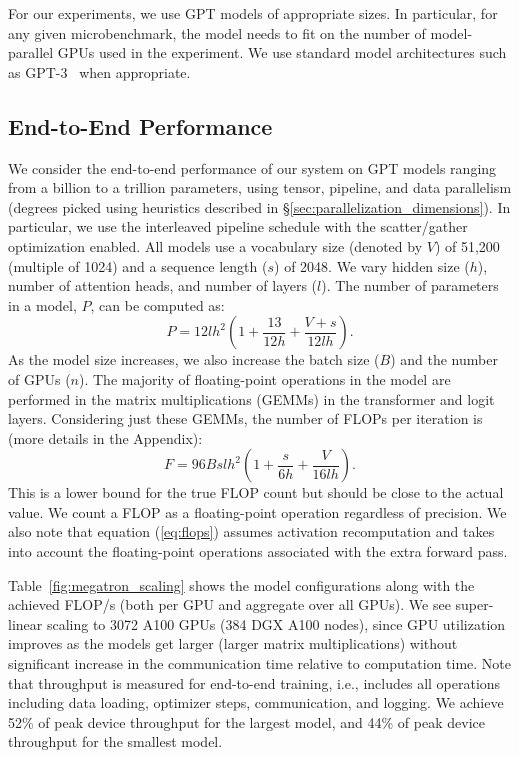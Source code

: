 \documentclass[sigconf,nonacm]{acmart}
\begin{document}
For our experiments, we use GPT models of appropriate sizes. In particular, for any given microbenchmark, the model needs to fit on the number of model-parallel GPUs used in the experiment. We use standard model architectures such as GPT-3~\cite{gpt3} when appropriate.

\subsection{End-to-End Performance}

We consider the end-to-end performance of our system on GPT models ranging from a billion to a trillion parameters, using tensor, pipeline, and data parallelism (degrees picked using heuristics described in \S\ref{sec:parallelization_dimensions}). In particular, we use the interleaved pipeline schedule with the scatter/gather optimization enabled. All models use a vocabulary size (denoted by $V$) of 51,200 (multiple of 1024) and a sequence length ($s$) of 2048. We vary hidden size ($h$), number of attention heads, and number of layers ($l$). The number of parameters in a model, $P$, can be computed as:
\begin{equation}
  P = 12lh^2\left(1 + \dfrac{13}{12h}+\dfrac{V+s}{12lh}\right).
  \label{eq:num-params}
\end{equation}
As the model size increases, we also increase the batch size ($B$) and the number of GPUs ($n$). The majority of floating-point operations in the model are performed in the matrix multiplications (GEMMs) in the transformer and logit layers. Considering just these GEMMs, the number of FLOPs per iteration is (more details in the Appendix):
\begin{equation}
    F=96Bslh^2\left(1 + \dfrac{s}{6h} + \dfrac{V}{16lh}\right).
    \label{eq:flops}
\end{equation}
This is a lower bound for the true FLOP count but should be close to the actual value. We count a FLOP as a floating-point operation regardless of precision. We also note that equation (\ref{eq:flops}) assumes activation recomputation and takes into account the floating-point operations associated with the extra forward pass.

Table~\ref{fig:megatron_scaling} shows the model configurations along with the achieved FLOP/s (both per GPU and aggregate over all GPUs). We see super-linear scaling to 3072 A100 GPUs (384 DGX A100 nodes), since GPU utilization improves as the models get larger (larger matrix multiplications) without significant increase in the communication time relative to computation time. Note that throughput is measured for end-to-end training, i.e., includes all operations including data loading, optimizer steps, communication, and logging. We achieve 52\% of peak device throughput for the largest model, and 44\% of peak device throughput for the smallest model.
\end{document}
